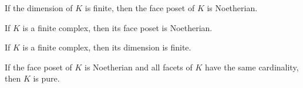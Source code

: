 \begin{sublemma}
If the dimension of $K$ is finite, then the face poset of $K$ is Noetherian.

\end{sublemma}

\begin{sublemma}
If $K$ is a finite complex, then its face poset is Noetherian.

\end{sublemma}

\begin{sublemma}
If $K$ is a finite complex, then its dimension is finite.

\end{sublemma}

\begin{sublemma}
If the face poset of $K$ is Noetherian and all facets of $K$ have the same cardinality, then $K$ is pure.

\end{sublemma}
